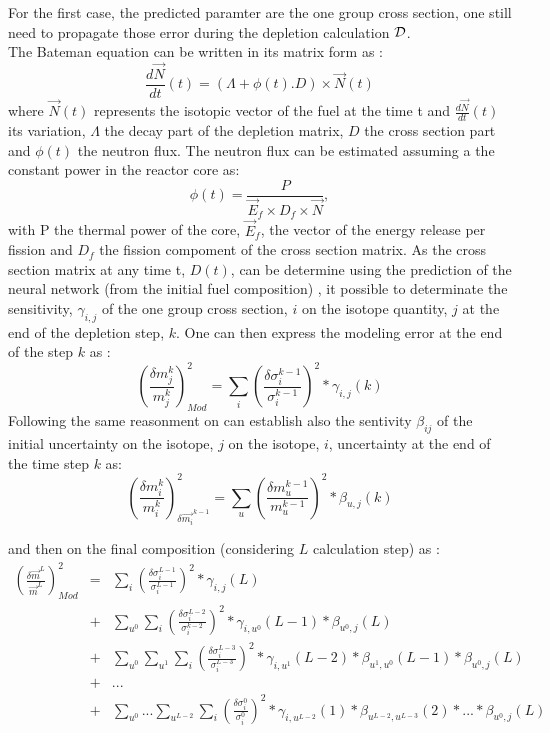 \documentclass[dvips,12pt]{article}
\begin{document}
For the first case, the predicted paramter are the
one group cross section, one still need to
propagate those error during the depletion
calculation ${\cal D}$.\\
The Bateman equation can be written in its matrix
form as :
\begin{equation}
  \frac{d\vec{N}}{dt}(t) = (\Lambda + \phi(t) . D) \times \vec{N}(t)
\end{equation}
where $\vec{N}(t)$ represents the isotopic vector
of the fuel at the time t and
$\frac{d\vec{N}}{dt}(t)$ its variation, $\Lambda$
the decay part of the depletion matrix, $D$ the
cross section part and $\phi(t)$ the neutron flux.
The neutron flux can be estimated assuming a the
constant power in the reactor core as:
\begin{equation}
  \phi(t) = \frac{P}{ \vec{E}_f \times D_f \times \vec{N}},
\end{equation}
with P the thermal power of the core, $\vec{E}_f$,
the vector of the energy release per fission and
$D_f$ the fission compoment of the cross section
matrix.
As the cross section matrix at any time t, $D(t)$,
can be determine using the prediction of the
neural network (from the initial fuel composition)
, it possible to determinate the sensitivity,
$\gamma_{i,j}$  of the one group cross section,
$i$ on the isotope quantity, $j$ at the end of the
depletion step, $k$. One can then express the
modeling error at the end of the step $k$ as :
\begin{equation}
  \left( \frac{\delta m_j^{k}}{m_j^{k}} \right)^{2} _{Mod} = \sum_{i}\left( \frac{\delta \sigma_i^{k-1}}{\sigma_i^{k-1}} \right)^{2} *\gamma_{i,j}(k)
\end{equation}
Following the same reasonment on can establish also the sentivity $\beta_{ij}$ of the initial uncertainty on the isotope, $j$ on the isotope, $i$, uncertainty at the end of the time step $k$ as:
\begin{equation}
  \left( \frac{\delta m_i^{k}}{m_i^{k}} \right)^{2} _{\delta \vec{m_i}^{k-1} } = \sum_{u}\left( \frac{\delta m_u^{k-1}}{m_u^{k-1}} \right)^{2} *\beta_{u,j}(k)
\end{equation}


and then on the final composition (considering $L$ calculation step) as :
\begin{eqnarray}
  \nonumber
  \left( \frac{\delta \vec{m}^{L}}{\vec{m}^{L}} \right)^{2} _{Mod} &=& \sum_{i} \left( \frac{\delta \sigma_i^{L-1}}{\sigma_i^{L-1}} \right)^{2} *\gamma_{i,j}(L)\\
\nonumber
  &+& \sum_{u^{0}}  \sum_{i} \left( \frac{\delta \sigma_i^{L-2}}{\sigma_i^{k-2}} \right)^{2} *\gamma_{i,u^{0}}(L-1) *\beta_{u^{0},j}(L)\\
\nonumber
&+& \sum_{u^{0}} \sum_{u^{1}} \sum_{i} \left( \frac{\delta \sigma_i^{L-3}}{\sigma_i^{L-3}} \right)^{2} *\gamma_{i,u^{1}}(L-2) *\beta_{u^{1},u^{0}}(L-1) *\beta_{u^{0},j}(L)\\
\nonumber
&+& ...\\
  &+& \sum_{u^{0}}... \sum_{u^{L-2}} \sum_{i} \left( \frac{\delta \sigma_i^{0}}{\sigma_i^{0}} \right)^{2} *\gamma_{i,u^{L-2}}(1)*\beta_{u^{L-2},u^{L-3}}(2)* ...  *\beta_{u^{0},j}(L)
\end{eqnarray}
\end{document}

